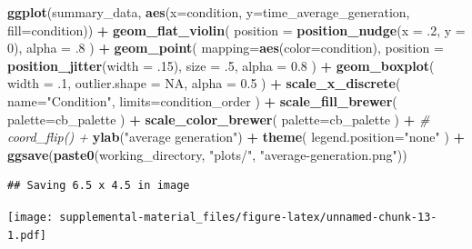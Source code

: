 \documentclass[]{book}
\newenvironment{Shaded}{\begin{snugshade}}{\end{snugshade}}
\newcommand{\CommentTok}[1]{\textcolor[rgb]{0.56,0.35,0.01}{\textit{#1}}}
\newcommand{\DataTypeTok}[1]{\textcolor[rgb]{0.13,0.29,0.53}{#1}}
\newcommand{\DecValTok}[1]{\textcolor[rgb]{0.00,0.00,0.81}{#1}}
\newcommand{\FloatTok}[1]{\textcolor[rgb]{0.00,0.00,0.81}{#1}}
\newcommand{\KeywordTok}[1]{\textcolor[rgb]{0.13,0.29,0.53}{\textbf{#1}}}
\newcommand{\NormalTok}[1]{#1}
\newcommand{\OperatorTok}[1]{\textcolor[rgb]{0.81,0.36,0.00}{\textbf{#1}}}
\newcommand{\OtherTok}[1]{\textcolor[rgb]{0.56,0.35,0.01}{#1}}
\newcommand{\StringTok}[1]{\textcolor[rgb]{0.31,0.60,0.02}{#1}}
\begin{document}
\begin{Shaded}
\begin{Highlighting}[]
\KeywordTok{ggplot}\NormalTok{(summary_data, }\KeywordTok{aes}\NormalTok{(}\DataTypeTok{x=}\NormalTok{condition, }\DataTypeTok{y=}\NormalTok{time_average_generation, }\DataTypeTok{fill=}\NormalTok{condition)) }\OperatorTok{+}
\StringTok{  }\KeywordTok{geom_flat_violin}\NormalTok{(}
    \DataTypeTok{position =} \KeywordTok{position_nudge}\NormalTok{(}\DataTypeTok{x =} \FloatTok{.2}\NormalTok{, }\DataTypeTok{y =} \DecValTok{0}\NormalTok{),}
    \DataTypeTok{alpha =} \FloatTok{.8}
\NormalTok{  ) }\OperatorTok{+}
\StringTok{  }\KeywordTok{geom_point}\NormalTok{(}
    \DataTypeTok{mapping=}\KeywordTok{aes}\NormalTok{(}\DataTypeTok{color=}\NormalTok{condition),}
    \DataTypeTok{position =} \KeywordTok{position_jitter}\NormalTok{(}\DataTypeTok{width =} \FloatTok{.15}\NormalTok{),}
    \DataTypeTok{size =} \FloatTok{.5}\NormalTok{,}
    \DataTypeTok{alpha =} \FloatTok{0.8}
\NormalTok{  ) }\OperatorTok{+}
\StringTok{  }\KeywordTok{geom_boxplot}\NormalTok{(}
    \DataTypeTok{width =} \FloatTok{.1}\NormalTok{,}
    \DataTypeTok{outlier.shape =} \OtherTok{NA}\NormalTok{,}
    \DataTypeTok{alpha =} \FloatTok{0.5}
\NormalTok{  ) }\OperatorTok{+}
\StringTok{  }\KeywordTok{scale_x_discrete}\NormalTok{(}
    \DataTypeTok{name=}\StringTok{"Condition"}\NormalTok{,}
    \DataTypeTok{limits=}\NormalTok{condition_order}
\NormalTok{  ) }\OperatorTok{+}
\StringTok{  }\KeywordTok{scale_fill_brewer}\NormalTok{(}
    \DataTypeTok{palette=}\NormalTok{cb_palette}
\NormalTok{  ) }\OperatorTok{+}
\StringTok{  }\KeywordTok{scale_color_brewer}\NormalTok{(}
    \DataTypeTok{palette=}\NormalTok{cb_palette}
\NormalTok{  ) }\OperatorTok{+}
\StringTok{  }\CommentTok{# coord_flip() +}
\StringTok{  }\KeywordTok{ylab}\NormalTok{(}\StringTok{"average generation"}\NormalTok{) }\OperatorTok{+}
\StringTok{  }\KeywordTok{theme}\NormalTok{(}
    \DataTypeTok{legend.position=}\StringTok{"none"}
\NormalTok{  ) }\OperatorTok{+}
\StringTok{  }\KeywordTok{ggsave}\NormalTok{(}\KeywordTok{paste0}\NormalTok{(working_directory, }\StringTok{"plots/"}\NormalTok{, }\StringTok{"average-generation.png"}\NormalTok{))}
\end{Highlighting}
\end{Shaded}

\begin{verbatim}
## Saving 6.5 x 4.5 in image
\end{verbatim}

\texttt{[image: supplemental-material\_files/figure-latex/unnamed-chunk-13-1.pdf]}
\end{document}
